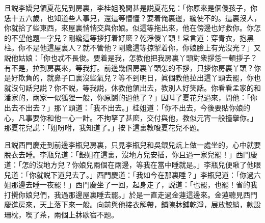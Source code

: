 且説李嬌兒領夏花兒到房裏，李桂姐晚間甚是説夏花兒：「你原來是個儍孩子，你恁十五六歲，也知道些人事兒，還這等懵懂？要着俺裏邊，纔使不的。這裏沒人，你就拾了些東西，來屋裏悄悄交與你娘。似這等拖出來，他在傍邊也好救你。你怎的不望他題一字兒？剛纔這等拶打着好麽？乾淨儍丫頭！常言道：穿青衣，抱黑柱。你不是他這屋裏人？就不管他？剛纔這等掠掣着你，你娘臉上有光沒光？」又説他姑娘：「你也忒不長俊。要着是我，怎教他把我房裏丫頭對衆拶恁一頓拶子？有不是，拉到房裏來，等我打。前邊幾個房裏丫頭怎的不拶，只拶你房裏丫頭？你是好欺負的，就鼻子口裏沒些氣兒？等不到明日，眞個教他拉出這丫頭去罷，你也就沒句話兒説？你不説，等我説，休教他領出去，教別人好笑話。你看看孟家的和潘家的，兩家一似狐狸一般，你原鬬的過他了？」因叫了夏花兒過來，問他：「你出去不出去？」那丫頭道：「我不出去。」桂姐道：「你不出去，今後要貼你娘的心，凡事要你和他一心一計。不拘拏了甚麽，交付與他，教似元宵一般擡擧你。」那夏花兒説：「姐吩咐，我知道了。」按下這裏教唆夏花兒不題。

且説西門慶走到前邊李瓶兒房裏，只見李瓶兒和吳銀兒炕上做一處坐的，心中就要脫衣去睡。李瓶兒道：「銀姐在這裏，沒地方兒安插，你且過一家兒罷！」西門慶道：「怎的沒地方兒？你娘兒兩個在兩邊，等我在當中睡就是。」李瓶兒便瞅了他眼兒道：「你就説下道兒去了。」西門慶道：「我如今在那裏睡？」李瓶兒道：「你過六姐那邊去睡一夜罷！」西門慶坐了一回，起身走了，説道：「也罷，也罷！省的我打攪你娘兒們，我過那邊屋裏睡去罷。」於是一直走過金蓮這邊來。金蓮聽見西門慶進房來，天上落下來一般。向前與他接衣解帶，鋪陳牀鋪乾淨，展放鮫綃，款設珊枕，喫了茶，兩個上牀歇宿不題。

